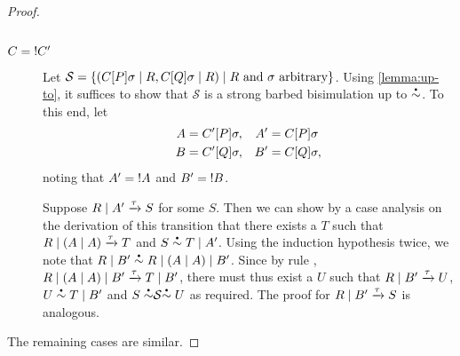 \begin{proof}
\begin{description}
\begin{equation*}
    \end{equation*}
  \item[\( C = {!}C' \)] Let \( \mathcal{S} = \{ (C[P]\sigma \mid R, C[Q]\sigma \mid R) \mid \text{$R$ and $\sigma$ arbitrary} \} \).
    Using \cref{lemma:up-to}, it suffices to show that \( \mathcal{S} \) is a strong barbed bisimulation up to \( \sbbisim{}{} \).
    To this end, let
    \begin{align*}
      A &= C'[P]\sigma, & A' &= C[P]\sigma \\
      B &= C'[Q]\sigma, & B' &= C[Q]\sigma ,
    \end{align*}
    noting that \( A' = {!}A \) and \( B' = {!}B \).

    Suppose \( R \mid A' \xrightarrow{\tau} S \) for some \( S \).
    Then we can show by a case analysis on the derivation of this transition that there exists a \( T \) such that \( R \mid (A \mid A) \xrightarrow{\tau} T \) and \( \sbbisim{S}{\Ppar{T}{A'}} \).
    Using the induction hypothesis twice, we note that \( \sbbisim{\Ppar{R}{B'}}{\Ppar{R}{\Ppar{(\Ppar{A}{A})}{B'}}} \).
    Since by rule , \( R \mid (A \mid A) \mid B' \xrightarrow{\tau} T \mid B' \), there must thus exist a \( U \) such that \( R \mid B' \xrightarrow{\tau} U \), \( \sbbisim{U}{\Ppar{T}{B'}} \) and \( \uptosbb{S}{\mathcal{S}}{U} \) as required.
    The proof for \( R \mid B' \xrightarrow{\tau} S \) is analogous.
  \end{description}
  The remaining cases are similar.
\end{proof}